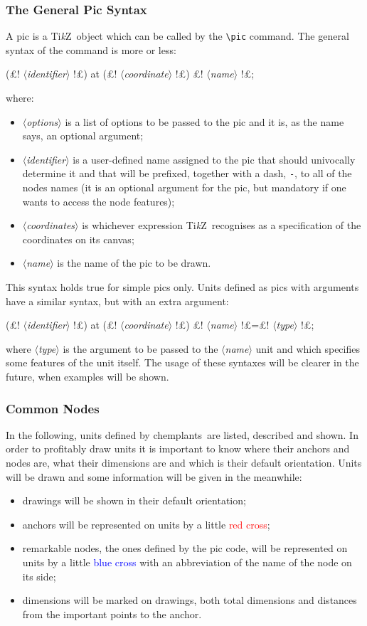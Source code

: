 \documentclass[12pt]{article}						%
\newcommand*{\meta}[1]{%
		$\langle$\textrm{\textit{#1}}$\rangle$%
	}
\newcommand*{\chemplants}{chemplants}
\newcommand*{\TikZ}{Ti\textit{k}Z}
\begin{document}
\subsubsection{The General Pic Syntax}

A pic is a \TikZ\ object which can be called by the \verb|\pic| command. The
general syntax of the command is more or less:
\begin{chpcode}
	\pic [£!\meta{options}!£] (£!\meta{identifier}!£) at (£!\meta{coordinate}!£) {£!\meta{name}!£};
\end{chpcode}
where:
\begin{itemize}
	\item \meta{options} is a list of options to be passed to the pic and it
		is, as the name says, an optional argument;
	\item \meta{identifier} is a user-defined name assigned to the pic that
		should univocally determine it and that will be prefixed, together with
		a dash, \verb|-|, to all of the nodes names (it is an optional argument
		for the pic, but mandatory if one wants to access the node features);
	\item \meta{coordinates} is whichever expression \TikZ\ recognises as a
		specification of the coordinates on its canvas;
	\item \meta{name} is the name of the pic to be drawn.
\end{itemize}
This syntax holds true for simple pics only. Units defined as pics with arguments
have a similar syntax, but with an extra argument:
\begin{chpcode}
	\pic [£!\meta{options}!£] (£!\meta{identifier}!£) at (£!\meta{coordinate}!£) {£!\meta{name}!£=£!\meta{type}!£};
\end{chpcode}
where \meta{type} is the argument to be passed to the \meta{name} unit and which
specifies some features of the unit itself. The usage of these syntaxes will
be clearer in the future, when examples will be shown.

\subsubsection{Common Nodes}

In the following, units defined by \chemplants\ are listed, described and shown.
In order to profitably draw units it is important to know where their anchors
and nodes are, what their dimensions are and which is their default orientation.
Units will be drawn and some information will be given in the meanwhile:
\begin{itemize}
	\item drawings will be shown in their default orientation;
	\item anchors will be represented on units by a little
		\textcolor{red}{red cross};
	\item remarkable nodes, the ones defined by the pic code, will be
		represented on units by a little \textcolor{blue}{blue cross} with an
		abbreviation of the name of the node on its side;
	\item dimensions will be marked on drawings, both total dimensions and
		distances from the important points to the anchor.
\end{itemize}
\end{document}
